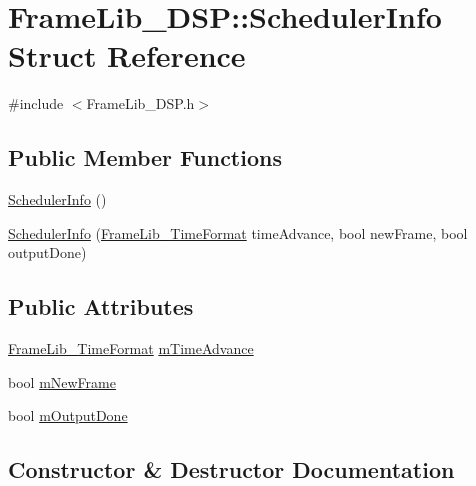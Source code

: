 \hypertarget{struct_frame_lib___d_s_p_1_1_scheduler_info}{}\section{Frame\+Lib\+\_\+\+D\+SP\+:\+:Scheduler\+Info Struct Reference}
\label{struct_frame_lib___d_s_p_1_1_scheduler_info}


{\ttfamily \#include $<$Frame\+Lib\+\_\+\+D\+S\+P.\+h$>$}

\subsection*{Public Member Functions}
\begin{DoxyCompactItemize}
\item 
\hyperlink{struct_frame_lib___d_s_p_1_1_scheduler_info_a5939a752d4ea50eea67c019805254a82}{Scheduler\+Info} ()
\item 
\hyperlink{struct_frame_lib___d_s_p_1_1_scheduler_info_a82a4ba6533c2d663620c4276b7d27dce}{Scheduler\+Info} (\hyperlink{_frame_lib___types_8h_a699a4071a9eaaa283906a5ebd0a79ac0}{Frame\+Lib\+\_\+\+Time\+Format} time\+Advance, bool new\+Frame, bool output\+Done)
\end{DoxyCompactItemize}
\subsection*{Public Attributes}
\begin{DoxyCompactItemize}
\item 
\hyperlink{_frame_lib___types_8h_a699a4071a9eaaa283906a5ebd0a79ac0}{Frame\+Lib\+\_\+\+Time\+Format} \hyperlink{struct_frame_lib___d_s_p_1_1_scheduler_info_ae38d8335efc201f8c2c967ffea7b6076}{m\+Time\+Advance}
\item 
bool \hyperlink{struct_frame_lib___d_s_p_1_1_scheduler_info_a88fa8b1c2060d60f4ae1cf164405c85f}{m\+New\+Frame}
\item 
bool \hyperlink{struct_frame_lib___d_s_p_1_1_scheduler_info_aee41d636cde5b117b4ce8610905d668d}{m\+Output\+Done}
\end{DoxyCompactItemize}


\subsection{Constructor \& Destructor Documentation}
\mbox{\label{struct_frame_lib___d_s_p_1_1_scheduler_info_a5939a752d4ea50eea67c019805254a82}} 
